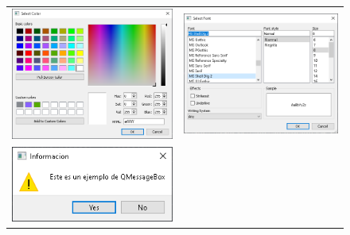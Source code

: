 \begin{figure}[H]
    \centering
    \begin{tabular}{c c}
        \includegraphics[scale=0.4]{imagenes/qtdesigner/qt_color_dialog.PNG} &
        \includegraphics[scale=0.5]{imagenes/qtdesigner/qt_font_dialog.PNG} \\
        \includegraphics[scale=0.6]{imagenes/qtdesigner/qt_message_dialog.PNG} &

\end{tabular}
\end{figure}
